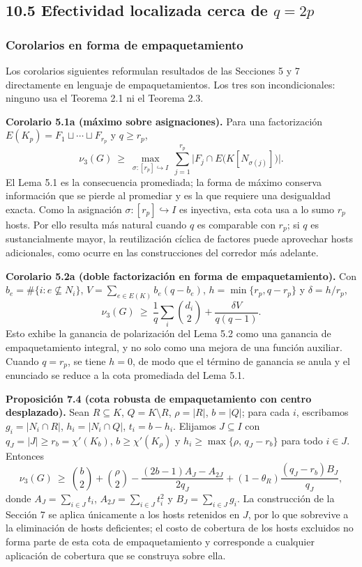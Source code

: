 \documentclass[spanish,11pt,a4paper]{article}
\begin{document}
\subsection{\texorpdfstring{10.5 Efectividad localizada cerca de
\(q=2p\)}{10.5 Efectividad localizada cerca de q=2p}}\label{efectividad-localizada-cerca-de-q2p}

\subsubsection{Corolarios en forma de
empaquetamiento}\label{corolarios-en-forma-de-empaquetamiento}

Los corolarios siguientes reformulan resultados de las Secciones 5 y 7
directamente en lenguaje de empaquetamientos. Los tres son
incondicionales: ninguno usa el Teorema 2.1 ni el Teorema 2.3.

\textbf{Corolario 5.1a (máximo sobre asignaciones).} Para una
factorización \(E(K_p)=F_1\sqcup\cdots\sqcup F_{r_p}\) y \(q\ge r_p\),
\[
\nu_3(G)\ \ge\ \max_{\sigma:[r_p]\hookrightarrow I}\ \sum_{j=1}^{r_p}\big|F_j\cap E\big(K[N_{\sigma(j)}]\big)\big|.
\] El Lema 5.1 es la consecuencia promediada; la forma de máximo
conserva información que se pierde al promediar y es la que requiere una
desigualdad exacta. Como la asignación \(\sigma:[r_p]\hookrightarrow I\)
es inyectiva, esta cota usa a lo sumo \(r_p\) hosts. Por ello resulta
más natural cuando \(q\) es comparable con \(r_p\); si \(q\) es
sustancialmente mayor, la reutilización cíclica de factores puede
aprovechar hosts adicionales, como ocurre en las construcciones del
corredor más adelante.

\textbf{Corolario 5.2a (doble factorización en forma de
empaquetamiento).} Con \(b_e=\#\{i:e\not\subseteq N_i\}\),
\(V=\sum_{e\in E(K)} b_e(q-b_e)\), \(h=\min\{r_p,q-r_p\}\) y
\(\delta=h/r_p\), \[
\nu_3(G)\ \ge\ \frac1q\sum_i\binom{d_i}{2}+\frac{\delta V}{q(q-1)}.
\] Esto exhibe la ganancia de polarización del Lema 5.2 como una
ganancia de empaquetamiento integral, y no solo como una mejora de una
función auxiliar. Cuando \(q=r_p\), se tiene \(h=0\), de modo que el
término de ganancia se anula y el enunciado se reduce a la cota
promediada del Lema 5.1.

\textbf{Proposición 7.4 (cota robusta de empaquetamiento con centro
desplazado).} Sean \(R\subseteq K\), \(Q=K\setminus R\), \(\rho=|R|\),
\(b=|Q|\); para cada \(i\), escribamos \(g_i=|N_i\cap R|\),
\(h_i=|N_i\cap Q|\), \(t_i=b-h_i\). Elijamos \(J\subseteq I\) con
\(q_J=|J|\ge r_b=\chi'(K_b)\), \(b\ge\chi'(K_\rho)\) y
\(h_i\ge\max\{\rho,\,q_J-r_b\}\) para todo \(i\in J\). Entonces \[
\nu_3(G)\ \ge\ \binom b2+\binom\rho2-\frac{(2b-1)A_J-A_{2J}}{2q_J}+(1-\theta_R)\frac{(q_J-r_b)B_J}{q_J},
\] donde \(A_J=\sum_{i\in J}t_i\), \(A_{2J}=\sum_{i\in J}t_i^2\) y
\(B_J=\sum_{i\in J}g_i\). La construcción de la Sección 7 se aplica
únicamente a los hosts retenidos en \(J\), por lo que sobrevive a la
eliminación de hosts deficientes; el costo de cobertura de los hosts
excluidos no forma parte de esta cota de empaquetamiento y corresponde a
cualquier aplicación de cobertura que se construya sobre ella.
\end{document}
